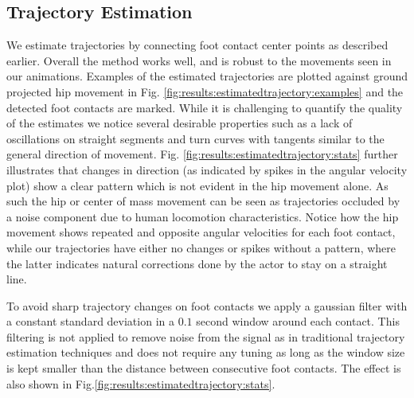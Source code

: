 \subsection{Trajectory Estimation}
We estimate trajectories by connecting foot contact center points as described earlier. Overall the method works well, and is robust to the movements seen in our animations. Examples of the estimated trajectories are plotted against ground projected hip movement in Fig. \ref{fig:results:estimatedtrajectory:examples} and the detected foot contacts are marked. While it is challenging to quantify the quality of the estimates we notice several desirable properties such as a lack of oscillations on straight segments and turn curves with tangents similar to the general direction of movement. Fig. \ref{fig:results:estimatedtrajectory:stats} further illustrates that changes in direction (as indicated by spikes in the angular velocity plot) show a clear pattern  which is not evident in the hip movement alone. As such the hip or center of mass movement can be seen as trajectories occluded by a noise component due to human locomotion characteristics. Notice how the hip movement shows repeated and opposite angular velocities for each foot contact, while our trajectories have either no changes or spikes without a pattern, where the latter indicates natural corrections done by the actor to stay on a straight line. 

To avoid sharp trajectory changes on foot contacts we apply a gaussian filter with a constant standard deviation in a $0.1$ second window around each contact. This filtering is not applied to remove noise from the signal as in traditional trajectory estimation techniques and does not require any tuning as long as the window size is kept smaller than the distance between consecutive foot contacts. The effect is also shown in Fig.\ref{fig:results:estimatedtrajectory:stats}.   

